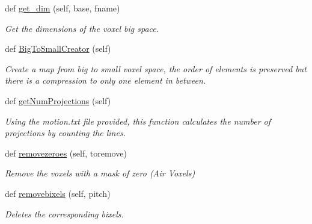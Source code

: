 \begin{DoxyCompactItemize}
\mbox{\label{classmultiTool_1_1tomodata_a5ee1741b8cee03ef45c948aae95d1a69}} 
def \mbox{\hyperlink{classmultiTool_1_1tomodata_a5ee1741b8cee03ef45c948aae95d1a69}{get\+\_\+dim}} (self, base, fname)
\begin{DoxyCompactList}\small\item\em Get the dimensions of the voxel big space. \end{DoxyCompactList}\item 
def \mbox{\hyperlink{classmultiTool_1_1tomodata_ae155fe953b7611fcf0dc7a261761ae15}{Big\+To\+Small\+Creator}} (self)
\begin{DoxyCompactList}\small\item\em Create a map from big to small voxel space, the order of elements is preserved but there is a compression to only one element in between. \end{DoxyCompactList}\item 
\mbox{\label{classmultiTool_1_1tomodata_adacf42bd78e33abfdb2afa77c2088cf3}} 
def \mbox{\hyperlink{classmultiTool_1_1tomodata_adacf42bd78e33abfdb2afa77c2088cf3}{get\+Num\+Projections}} (self)
\begin{DoxyCompactList}\small\item\em Using the motion.\+txt file provided, this function calculates the number of projections by counting the lines. \end{DoxyCompactList}\item 
\mbox{\label{classmultiTool_1_1tomodata_a036908561acc8715dbfe4a93a1e90038}} 
def \mbox{\hyperlink{classmultiTool_1_1tomodata_a036908561acc8715dbfe4a93a1e90038}{removezeroes}} (self, toremove)
\begin{DoxyCompactList}\small\item\em Remove the voxels with a mask of zero (Air Voxels) \end{DoxyCompactList}\item 
\mbox{\label{classmultiTool_1_1tomodata_adc8f463528343cdd7a6deb9a49b696d5}} 
def \mbox{\hyperlink{classmultiTool_1_1tomodata_adc8f463528343cdd7a6deb9a49b696d5}{removebixels}} (self, pitch)
\begin{DoxyCompactList}\small\item\em Deletes the corresponding bixels. \end{DoxyCompactList}\item 

\end{DoxyCompactItemize}
